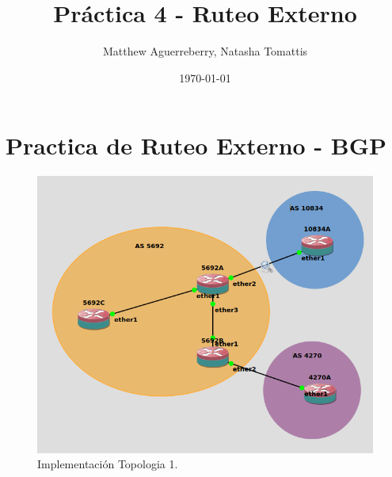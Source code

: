 \documentclass[letterpaper,12pt]{article}
\begin{document}
\title{Práctica 4 - Ruteo Externo}
\author{Matthew Aguerreberry, Natasha Tomattis}
\date{\today}
\maketitle



\section{Practica de Ruteo Externo - BGP}
	\begin{figure}[ht] 
			
		\centering \includegraphics[width=0.6\columnwidth]{figure/bgp-topo.png}
		\caption{
				\label{fig:samplesetup} %
				Implementación Topologia 1.
		}
	\end{figure}
\end{document}
